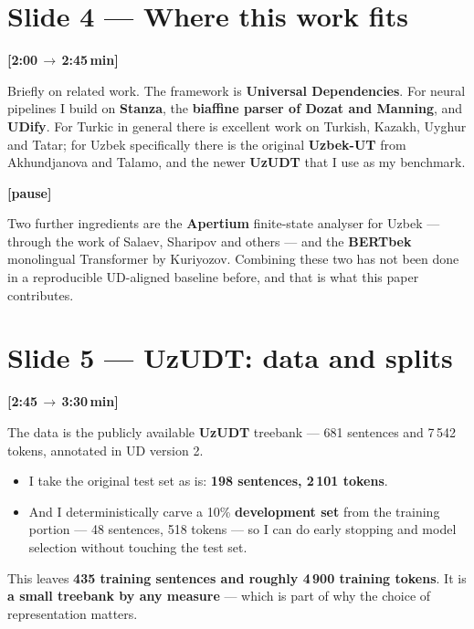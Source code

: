 \documentclass[12pt,a4paper]{article}
\newcommand{\timing}[2]{%
   \par\noindent\textbf{\small [#1\,$\to$\,#2\,min]}\par\vspace{0.2em}}
\newcommand{\say}[1]{\textbf{#1}}
\newcommand{\pause}{\par\vspace{0.4em}\textbf{[pause]}\par}
\begin{document}
\section*{Slide 4 --- Where this work fits}
\timing{2:00}{2:45}

Briefly on related work. The framework is \textbf{Universal Dependencies}.
For neural pipelines I build on \textbf{Stanza}, the \textbf{biaffine
parser of Dozat and Manning}, and \textbf{UDify}. For Turkic in general
there is excellent work on Turkish, Kazakh, Uyghur and Tatar; for Uzbek
specifically there is the original \say{Uzbek-UT} from
Akhundjanova and Talamo, and the newer \say{UzUDT} that I use as my
benchmark.

\pause

Two further ingredients are the \textbf{Apertium} finite-state analyser
for Uzbek --- through the work of Salaev, Sharipov and others --- and the
\textbf{BERTbek} monolingual Transformer by Kuriyozov. Combining these
two has not been done in a reproducible UD-aligned baseline before, and
that is what this paper contributes.

\section*{Slide 5 --- UzUDT: data and splits}
\timing{2:45}{3:30}

The data is the publicly available \say{UzUDT} treebank --- 681 sentences
and 7\,542 tokens, annotated in UD version 2.

\begin{itemize}
   \item I take the original test set as is: \textbf{198 sentences, 2\,101 tokens}.
   \item And I deterministically carve a 10\% \textbf{development set} from the training portion --- 48 sentences, 518 tokens --- so I can do early stopping and model selection without touching the test set.
\end{itemize}

\noindent
This leaves \textbf{435 training sentences and roughly 4\,900 training
tokens}. It is \say{a small treebank by any measure} --- which is part of
why the choice of representation matters.

\end{document}
